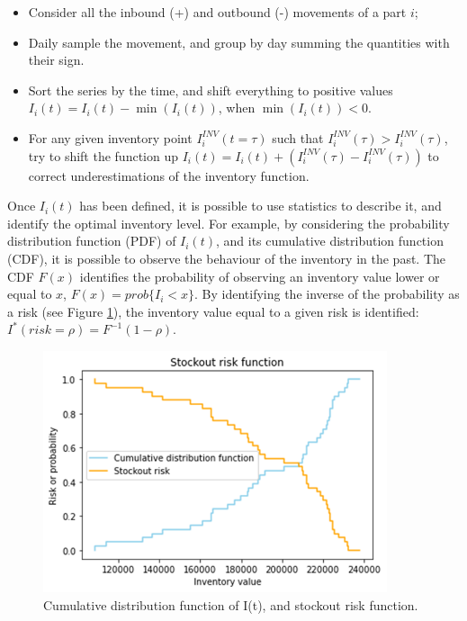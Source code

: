 \begin{itemize}
    \item Consider all the inbound (+) and outbound (-) movements of a part $i$;
	\item Daily sample the movement, and group by day summing the quantities with their sign.
	\item Sort the series by the time, and shift everything to positive values $I_i\left(t\right)=I_i\left(t\right)-\min(I_i\left(t\right))$, when $\min{\left(I_i\left(t\right)\right)}<0$.
	\item For any given inventory point $I_i^{INV}(t=\tau)$ such that $I_i^{INV}\left(\tau\right)>I_i^{INV}\left(\tau\right)$, try to shift the function up $I_i\left(t\right)=I_i\left(t\right)+(I_i^{INV}\left(\tau\right)-I_i^{INV}\left(\tau\right))$ to correct underestimations of the inventory function.

\end{itemize}

Once $I_i(t)$ has been defined, it is possible to use statistics to describe it, and identify the optimal inventory level. For example, by considering the probability distribution function (PDF) of $I_i(t)$, and its cumulative distribution function (CDF), it is possible to observe the behaviour of the inventory in the past. The CDF $F(x)$ identifies the probability of observing an inventory value lower or equal to $x$, $F\left(x\right)=prob\{I_i<x\}$. By identifying the inverse of the probability as a risk (see Figure \ref{fig_stockout}), the inventory value equal to a given risk is identified: $I^\ast\left(risk=\rho\right)=F^{-1}\left(1-\rho\right)$. 

\begin{figure}[hbt!]
\centering
\includegraphics[width=0.9\textwidth]{SectionWarehouses/design_figures/fig_stockout.png}
\captionsetup{type=figure}
\caption{Cumulative distribution function of I(t), and stockout risk function.}
\label{fig_stockout}
\end{figure}


